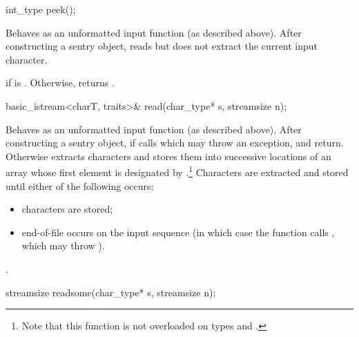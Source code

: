 %
\begin{itemdecl}
int_type peek();
\end{itemdecl}

\begin{itemdescr}
\pnum
\effects
Behaves as an unformatted input function
(as described above).
After constructing a sentry object, reads but does not extract
the current input character.

\pnum
\returns
{}
if
is
.
Otherwise, returns
.
\end{itemdescr}

%
\begin{itemdecl}
basic_istream<charT, traits>& read(char_type* s, streamsize n);
\end{itemdecl}

\begin{itemdescr}
\pnum
\effects
Behaves as an unformatted input function (as described above).
After constructing
a sentry object, if
calls
which may throw an exception,
and return.
Otherwise extracts characters and stores them
into successive locations of an array whose first element is designated by
.\footnote{Note that this function is not overloaded on types
and
.}
Characters are extracted and stored until either of the following occurs:
\begin{itemize}
\item
{} characters are stored;
\item
end-of-file occurs on the input sequence
(in which case the function calls
,
which may throw
).
\end{itemize}

\pnum
\returns
{}.
\end{itemdescr}

%
\begin{itemdecl}
streamsize readsome(char_type* s, streamsize n);
\end{itemdecl}

